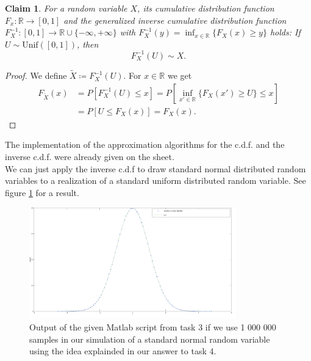 \documentclass{scrartcl}
\newtheorem{claim}{Claim}
\begin{document}
	\begin{claim}
		For a random variable $X$, its cumulative distribution function $F_x : \mathbb{R} \to [0,1]$ and the generalized inverse cumulative distribution function $F_X^{-1} : [0,1] \to \mathbb{R}\cup\{-\infty, +\infty\}$ with $F_X^{-1}(y)=\inf_{x\in\mathbb{R}}\{F_X(x)\geq y\}$ holds:
		If $U\sim\textrm{Unif}([0,1])$, then
		\begin{equation}
			F_X^{-1}(U)\sim X.
		\end{equation}
	\end{claim}
	\begin{proof}
		We define $\tilde{X}\coloneqq F_X^{-1}(U)$. For $x\in\mathbb{R}$ we get
		\begin{align}
			F_{\tilde{X}}(x) &= P\left[F_X^{-1}(U) \leq x\right] = P\left[\inf_{x'\in\mathbb{R}}\{F_X(x')\geq U\} \leq x\right] \\
			&= P\left[U \leq F_X(x)\right] = F_X(x). 
		\end{align}
	\end{proof}
	The implementation of the approximation algorithms for the c.d.f. and the inverse c.d.f. were already given on the sheet. \\
	We can just apply the inverse c.d.f to draw standard normal distributed random variables to a realization of a standard uniform distributed random variable. See figure \ref{fig_moro_samp} for a result.
	\begin{figure}[h]
		\centering
		\includegraphics[width=0.8\textwidth]{samples_moro}
		\caption{Output of the given Matlab script from task 3 if we use 1 000 000 samples in our simulation of a standard normal random variable using the idea explainded in our answer to task 4.}
		\label{fig_moro_samp}
	\end{figure}
	
\end{document}

